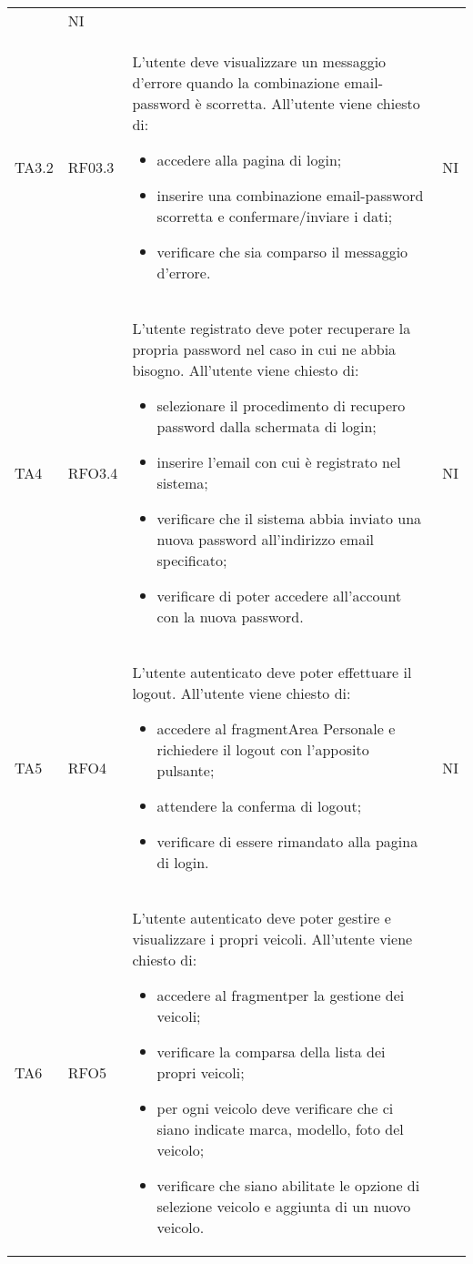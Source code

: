 \begin{longtable}{ >{\centering}p{} >{\centering}p{} >{\centering}p{}
			>{\centering}p{}}
\begin{itemize}
		 \end{itemize}  &	NI	\tabularnewline
		 TA3.2 & RF03.3 &	L'utente deve visualizzare un messaggio d'errore quando la combinazione email-password è scorretta. All'utente viene chiesto di:
		 \begin{itemize}
		 	\item accedere alla pagina di login;
		 	\item inserire una combinazione email-password scorretta e confermare/inviare i dati;
		 	\item verificare che sia comparso il messaggio d'errore.
		 \end{itemize}  &	NI	\tabularnewline
		 TA4 & RFO3.4	&	L'utente registrato deve poter recuperare la propria password nel caso in cui ne abbia bisogno. All'utente viene chiesto di:
		 \begin{itemize}
		 	\item selezionare il procedimento di recupero password dalla schermata di login;
		 	\item inserire l'email con cui è registrato nel sistema;
		 	\item verificare che il sistema abbia inviato una nuova password all'indirizzo email specificato;
		 	\item verificare di poter accedere all'account con la nuova password.
		 \end{itemize}	&	NI	\tabularnewline
		 TA5	& RFO4 &	L'utente autenticato deve poter effettuare il logout. All'utente viene chiesto di:
		 \begin{itemize}
		 	\item accedere al fragment\glosp Area Personale e richiedere il logout con l'apposito pulsante;
		 	\item attendere la conferma di logout;
		 	\item verificare di essere rimandato alla pagina di login.
		 \end{itemize}  &	NI	\tabularnewline
		 TA6	& RFO5 & L'utente autenticato deve poter gestire e visualizzare i propri veicoli. 
		 All'utente viene chiesto di:
		 \begin{itemize}
		 	\item accedere al fragment\glosp per la gestione dei veicoli;
		 	\item verificare la comparsa della lista dei propri veicoli;
		 	\item per ogni veicolo deve verificare che ci siano indicate marca, modello, foto del veicolo;
		 	\item verificare che siano abilitate le opzione di selezione veicolo e aggiunta di un nuovo veicolo. 

\end{itemize}
\end{longtable}
